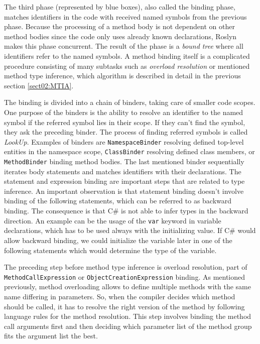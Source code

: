 The third phase (represented by blue boxes), also called the binding phase, matches identifiers in the code with received named symbols from the previous phase. 
Because the processing of a method body is not dependent on other method bodies since the code only uses already known declarations, Roslyn makes this phase concurrent. 
The result of the phase is a \emph{bound tree} where all identifiers refer to the named symbols. 
A method binding itself is a complicated procedure consisting of many subtasks such as \emph{overload resolution} or mentioned method type inference, which algorithm is described in detail in the previous section \ref{sect02:MTIA}.
\par
The binding is divided into a chain of binders, taking care of smaller code scopes. 
One purpose of the binders is the ability to resolve an identifier to the named symbol if the referred symbol lies in their scope. 
If they can’t find the symbol, they ask the preceding binder. 
The process of finding referred symbols is called \emph{LookUp}. 
Examples of binders are \texttt{NamespaceBinder} resolving defined top-level entities in the namespace scope, \texttt{ClassBinder} resolving defined class members, or \texttt{MethodBinder} binding method bodies. 
The last mentioned binder sequentially iterates body statements and matches identifiers with their declarations. 
The statement and expression binding are important steps that are related to type inference.
An important observation is that statement binding doesn’t involve binding of the following statements, which can be referred to as backward binding. 
The consequence is that C\# is not able to infer types in the backward direction. 
An example can be the usage of the \texttt{var} keyword in variable declarations, which has to be used always with the initializing value. 
If C\# would allow backward binding, we could initialize the variable later in one of the following statements which would determine the type of the variable.
\par
The preceding step before method type inference is overload resolution, part of \texttt{MethodCallExpression} or \texttt{ObjectCreationExpression} binding. 
As mentioned previously, method overloading allows to define multiple methods with the same name differing in parameters. 
So, when the compiler decides which method should be called, it has to resolve the right version of the method by following language rules for the method resolution. 
This step involves binding the method call arguments first and then deciding which parameter list of the method group fits the argument list the best. 
